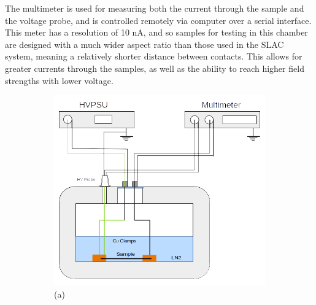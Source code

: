 \documentclass[a4paper,12pt]{article}
\begin{document}
The multimeter is used for measuring both the current through the sample and the voltage probe, and is controlled remotely via computer over a serial interface.  This meter has a resolution of 10 nA, and so samples for testing in this chamber are designed with a much wider aspect ratio than those used in the SLAC system, meaning a relatively shorter distance between contacts.  This allows for greater currents through the samples, as well as the ability to reach higher field strengths with lower voltage.

\begin{figure}[htb]
\centering
\begin{subfigure}[c]{0.59\linewidth}
	\begin{center}
		\includegraphics[width=\linewidth]{MSU_styro_setup.png}
		(a)
	\end{center}
\end{subfigure}
\begin{subfigure}[c]{0.39\linewidth}
	\begin{center}
		\vspace*{4em} 
		

\end{center}
\end{subfigure}
\end{figure}
\end{document}
